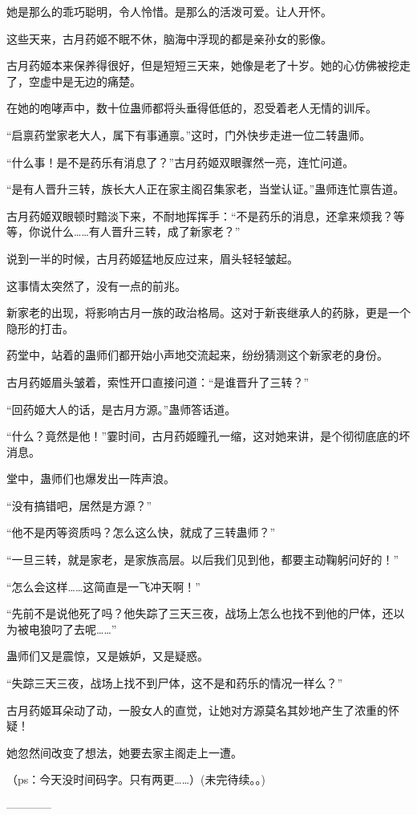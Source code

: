 \begin{this_body}
她是那么的乖巧聪明，令人怜惜。是那么的活泼可爱。让人开怀。

这些天来，古月药姬不眠不休，脑海中浮现的都是亲孙女的影像。

古月药姬本来保养得很好，但是短短三天来，她像是老了十岁。她的心仿佛被挖走了，空虚中是无边的痛楚。

在她的咆哮声中，数十位蛊师都将头垂得低低的，忍受着老人无情的训斥。

“启禀药堂家老大人，属下有事通禀。”这时，门外快步走进一位二转蛊师。

“什么事！是不是药乐有消息了？”古月药姬双眼骤然一亮，连忙问道。

“是有人晋升三转，族长大人正在家主阁召集家老，当堂认证。”蛊师连忙禀告道。

古月药姬双眼顿时黯淡下来，不耐地挥挥手：“不是药乐的消息，还拿来烦我？等等，你说什么……有人晋升三转，成了新家老？”

说到一半的时候，古月药姬猛地反应过来，眉头轻轻皱起。

这事情太突然了，没有一点的前兆。

新家老的出现，将影响古月一族的政治格局。这对于新丧继承人的药脉，更是一个隐形的打击。

药堂中，站着的蛊师们都开始小声地交流起来，纷纷猜测这个新家老的身份。

古月药姬眉头皱着，索性开口直接问道：“是谁晋升了三转？”

“回药姬大人的话，是古月方源。”蛊师答话道。

“什么？竟然是他！”霎时间，古月药姬瞳孔一缩，这对她来讲，是个彻彻底底的坏消息。

堂中，蛊师们也爆发出一阵声浪。

“没有搞错吧，居然是方源？”

“他不是丙等资质吗？怎么这么快，就成了三转蛊师？”

“一旦三转，就是家老，是家族高层。以后我们见到他，都要主动鞠躬问好的！”

“怎么会这样……这简直是一飞冲天啊！”

“先前不是说他死了吗？他失踪了三天三夜，战场上怎么也找不到他的尸体，还以为被电狼叼了去呢……”

蛊师们又是震惊，又是嫉妒，又是疑惑。

“失踪三天三夜，战场上找不到尸体，这不是和药乐的情况一样么？”

古月药姬耳朵动了动，一股女人的直觉，让她对方源莫名其妙地产生了浓重的怀疑！

她忽然间改变了想法，她要去家主阁走上一遭。

（ps：今天没时间码字。只有两更……）(未完待续。。)

------------

\end{this_body}

